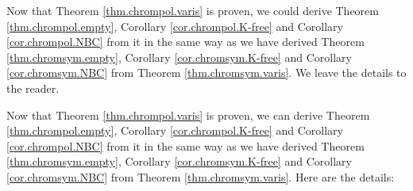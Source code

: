 \documentclass[numbers=enddot,12pt,final,onecolumn,notitlepage]{scrartcl}%
\theoremstyle{definition}
\newenvironment{verlong}{}{}
\newenvironment{vershort}{}{}
\begin{document}
\begin{vershort}
Now that Theorem \ref{thm.chrompol.varis} is proven, we could derive Theorem
\ref{thm.chrompol.empty}, Corollary \ref{cor.chrompol.K-free} and Corollary
\ref{cor.chrompol.NBC} from it in the same way as we have derived Theorem
\ref{thm.chromsym.empty}, Corollary \ref{cor.chromsym.K-free} and Corollary
\ref{cor.chromsym.NBC} from Theorem \ref{thm.chromsym.varis}. We leave the
details to the reader.
\end{vershort}

\begin{verlong}
Now that Theorem \ref{thm.chrompol.varis} is proven, we can derive Theorem
\ref{thm.chrompol.empty}, Corollary \ref{cor.chrompol.K-free} and Corollary
\ref{cor.chrompol.NBC} from it in the same way as we have derived Theorem
\ref{thm.chromsym.empty}, Corollary \ref{cor.chromsym.K-free} and Corollary
\ref{cor.chromsym.NBC} from Theorem \ref{thm.chromsym.varis}. Here are the details:
\end{verlong}
\end{document}
